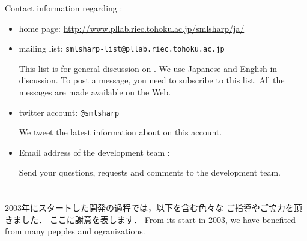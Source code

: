 	Contact information regarding \smlsharp{}:
\begin{itemize}
\item \smlsharp{} home page:
\url{http://www.pllab.riec.tohoku.ac.jp/smlsharp/ja/}

\item \smlsharp{} mailing list:
{\tt smlsharp-list@pllab.riec.tohoku.ac.jp}

	This list is for general discussion on \smlsharp{}.
	We use Japanese and English in discussion.
	To post a message, you need to subscribe to this list.
	All the messages are made available on the Web.


\item \smlsharp{} twitter account:
{\tt @smlsharp}

	We tweet the latest information about \smlsharp{} on this account.

\item Email address of the \smlsharp{} development team :

Send your questions, requests and comments to the development team.
\end{itemize}
\fi%

\section{}
\label{sec:acknowledgements}
	
\ifjp%
	2003年にスタートした\smlsharp{}開発の過程では，以下を含む色々な
ご指導やご協力を頂きました．
	ここに謝意を表します．
\else%
	From its start in 2003, we have benefited from many pepples and
ogranizations.
\fi%
	
\subsection{}

